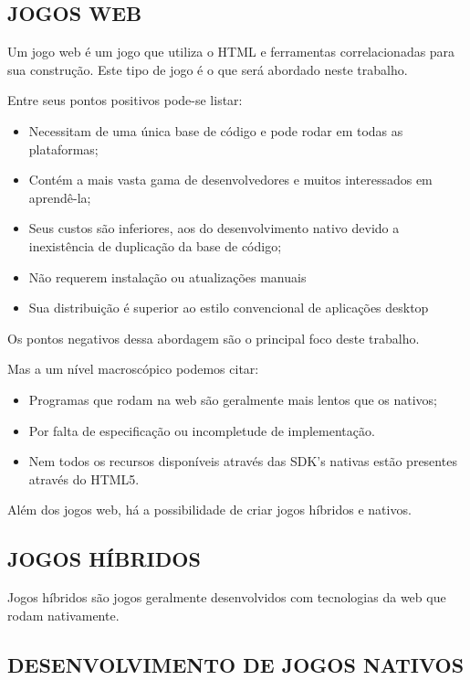 \documentclass[
12pt,
a4paper,
portuges,
draft
]{report}
\begin{document}
\subsection{JOGOS WEB}

Um jogo web é um jogo que utiliza o HTML e
ferramentas correlacionadas para sua construção. Este tipo de jogo
é o que será abordado neste trabalho.

Entre seus pontos positivos pode-se listar:

\begin{itemize}
\item Necessitam de uma única base de código e pode rodar em todas as
plataformas;
\item Contém a mais vasta gama de desenvolvedores e muitos
interessados em aprendê-la;
\item Seus custos são inferiores, aos do desenvolvimento nativo devido a 
inexistência de duplicação da base de código;
\item  Não requerem instalação ou atualizações manuais
\item  Sua distribuição é superior ao estilo convencional de aplicações desktop\autocite{browserGamesTechnologyAndFuture}
\end{itemize}

Os pontos negativos dessa abordagem são o principal foco deste trabalho.

Mas a um nível macroscópico podemos citar:
\begin{itemize}
\item Programas que rodam na web são geralmente mais lentos que os
nativos;
\item Por falta de especificação ou incompletude de implementação.
\item Nem todos os recursos disponíveis através das SDK's nativas estão presentes através do HTML5.
\end{itemize}

Além dos jogos web, há a possibilidade de criar jogos híbridos e nativos.

\subsection{JOGOS HÍBRIDOS}

Jogos híbridos são jogos geralmente desenvolvidos com tecnologias da
web que rodam nativamente.

\subsection{DESENVOLVIMENTO DE JOGOS NATIVOS}
\end{document}
